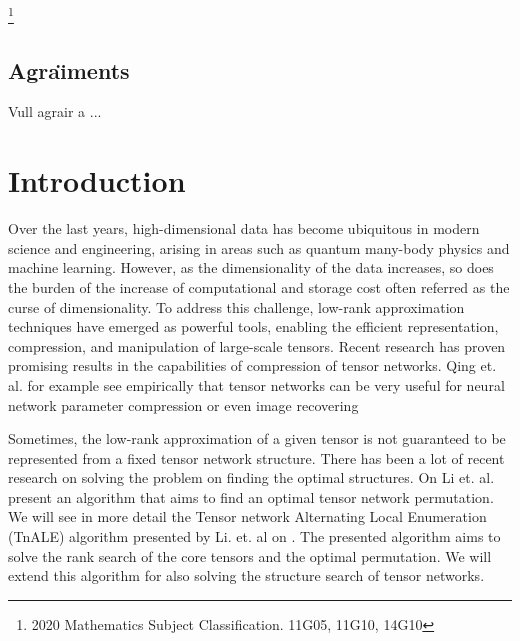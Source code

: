 \documentclass[11pt,a4paper,openright,oneside]{book}
\numberwithin{equation}{section}
\begin{document}
{\let\thefootnote\relax\footnote{2020 Mathematics Subject Classification. 11G05, 11G10, 14G10}}



\newpage 


\section*{Agra\"{\i}ments}

Vull agrair a ... 
\newpage

{\hypersetup{linkcolor=black}
\tableofcontents
}

\newpage
\printglossary[title=Glossary]
\newpage
{} 
\setcounter{page}{1}
\chapter{Introduction}


Over the last years, high-dimensional data has become ubiquitous in modern science and engineering,
arising in areas such as quantum many-body physics and machine learning. However, as the dimensionality of the
data increases, so does the burden of the increase of computational and storage cost often referred
as the curse of dimensionality. To address this challenge, low-rank approximation techniques have emerged as powerful tools,
enabling the efficient representation, compression, and manipulation of large-scale tensors. Recent research 
has proven promising results in the capabilities of compression of
tensor networks. Qing et. al. for example see empirically that tensor networks can be very useful
for neural network parameter compression \cite{qingCompressingNeuralNetworks2025} or even image
recovering \cite{lyuMultiDimensionalImageRecovery2022}

Sometimes, the low-rank approximation of a given tensor is not guaranteed to be represented from
a fixed tensor network structure. There has been a lot of recent research on solving
the problem on finding the optimal structures. On \cite{liPermutationSearchTensor2022} Li et. al. 
present an algorithm that aims to find an optimal tensor network permutation.
We will see in more detail the Tensor network Alternating Local Enumeration (\gls{TnALE}) algorithm presented
by Li. et. al on \cite{liAlternatingLocalEnumeration2023}. The presented algorithm aims to
solve the rank search of the core tensors and the optimal permutation. We will extend this algorithm
for also solving the structure search of tensor networks.
\end{document}
